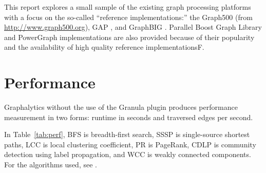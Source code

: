 \documentclass[conference]{IEEEtran}
\begin{document}
This report explores a small sample of the existing graph processing platforms with a focus on the so-called ``reference implementations:'' the Graph500 (from \url{http://www.graph500.org}), GAP \cite{Beamer:2015:GAPBench}, and GraphBIG \cite{Nai:2015:Graphbig}. Parallel Boost Graph Library \cite{Gregor:2005:PBGL} and PowerGraph \cite{Gonzalez:2012:Powergraph} implementations are also provided because of their popularity and the availability of high quality reference implementationsF.

\section{Performance}
Graphalytics without the use of the Granula plugin produces performance measurement in two forms: runtime in seconds and traversed edges per second.


In Table~\ref{tab:perf}, BFS is breadth-first search, SSSP is single-source shortest paths, LCC is local clustering coefficient, PR is PageRank, CDLP is community detection using label propagation, and WCC is weakly connected components. For the algorithms used, see \cite{Iosup:2016:Graphalyticstech}.

\begin{table}[!htb]
	\centering

		\centering
	\caption{Performance Results for the \texttt{dota-league} dataset with 61,670 vertices and 50,870,313 edges.}
	\label{tab:perf}
\end{table}
\end{document}
